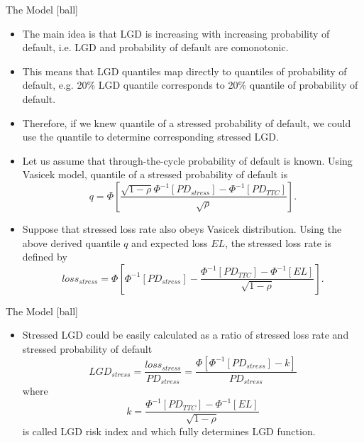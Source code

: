 \documentclass{beamer}
\begin{document}
\begin{frame}{The Model}
[ball]
\begin{itemize}
	\item The main idea is that LGD is increasing with increasing probability of default, i.e. LGD and probability of default are comonotonic.
	\item This means that LGD quantiles map directly to quantiles of probability of default, e.g. 20\% LGD quantile corresponds to 20\% quantile of probability of default.
	\item Therefore, if we knew quantile of a stressed probability of default, we could use the quantile to determine corresponding stressed LGD.
	\item Let us assume that through-the-cycle probability of default is known. Using Vasicek model, quantile of a stressed probability of default is
		\begin{equation}
			q = \Phi \left[\frac{\sqrt{1 - \rho} \Phi^{-1}[PD_{stress}] - 
			\Phi^{-1}[PD_{TTC}]}{\sqrt{\rho}}\right].
		\end{equation}
	\item Suppose that stressed loss rate also obeys Vasicek distribution. Using the above derived quantile $q$ and expected loss $EL$, the stressed loss rate is defined by
		\begin{equation}
			loss_{stress} = \Phi\left[\Phi^{-1}[PD_{stress}] - \frac{\Phi^{-1}[PD_{TTC}] - \Phi^{-1}[EL]}{\sqrt{1 - \rho}}\right].
		\end{equation}
\end{itemize}
\end{frame}

\begin{frame}{The Model}
[ball]
\begin{itemize}
	\item Stressed LGD could be easily calculated as a ratio of stressed loss rate and stressed probability of default
		\begin{equation}
			LGD_{stress} = \frac{loss_{stress}}{PD_{stress}} = \frac{\Phi\left[\Phi^{-1}[PD_{stress}] - 
			k\right]}{PD_{stress}}
		\end{equation}
		where
		\begin{equation}
			k = \frac{\Phi^{-1}[PD_{TTC}] - \Phi^{-1}[EL]}{\sqrt{1 - \rho}}
		\end{equation}
		is called LGD risk index and which fully determines LGD function.
\end{itemize}
\end{frame}
\end{document}
